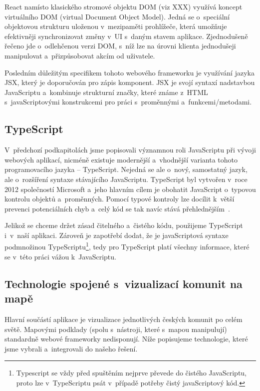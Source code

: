 React namísto klasického stromové objektu DOM (viz XXX) využívá koncept virtuálního DOM (virtual Document Object Model). Jedná se o~speciální objektovou strukturu uloženou v~mezipaměti prohlížeče, která umožňuje efektivněji synchronizovat změny v~UI s~daným stavem aplikace. Zjednodušeně řečeno jde o~odlehčenou verzi DOM, s~níž lze na úrovni klienta jednodušeji manipulovat a~přizpůsobovat akcím od uživatele.

Posledním důležitým specifikem tohoto webového frameworku je využívání jazyka JSX, který je doporučován pro zápis komponent. JSX je svojí syntaxí nadstavbou JavaScriptu a~kombinuje strukturní značky, které známe z~HTML s~javaScriptovými konstrukcemi pro práci s~proměnnými a~funkcemi/metodami.

\hypertarget{typescript}{%
\subsection{TypeScript}\label{typescript}}

V~předchozí podkapitolách jsme popisovali významnou roli JavaScriptu při vývoji webových aplikací, nicméně existuje modernější a~vhodnější varianta tohoto programovacího jazyka -- TypeScript. Nejedná se ale o~nový, samostatný jazyk, ale o~rozšíření syntaxe stávajícího JavaScriptu. TypeScript byl vytvořen v~roce 2012 společností Microsoft a~jeho hlavním cílem je obohatit JavaScript o~typovou kontrolu objektů a~proměnných. Pomocí typové kontroly lze docílit k~větší prevenci potenciálních chyb a~celý kód se tak navíc stává přehlednějším~\parencite{typescript}.

Jelikož se chceme držet zásad čitelného a~čistého kódu, použijeme TypeScript i~v~naší aplikaci. Zároveň je zapotřebí dodat, že je javaScriptová syntaxe podmnožinou TypeScriptu\footnote{Typescript se vždy před spuštěním nejprve převede do čistého JavaScriptu, proto lze v~TypeScriptu psát v~případě potřeby čistý javaScriptový kód.}, tedy pro TypeScript platí všechny informace, které se v~této práci vážou k~JavaScriptu.

\hypertarget{technologie-spojenuxe9-s-vizualizacuxed-komunit-na-mapux11b}{%
\subsection{Technologie spojené s~vizualizací komunit na mapě}\label{technologie-spojenuxe9-s-vizualizacuxed-komunit-na-mapux11b}}

Hlavní součástí aplikace je vizualizace jednotlivých českých komunit po celém světě. Mapovými podklady (spolu s~nástroji, které s~mapou manipulují) standardně webové frameworky nedisponují. Níže popisujeme technologie, které jsme vybrali a~integrovali do našeho řešení.

